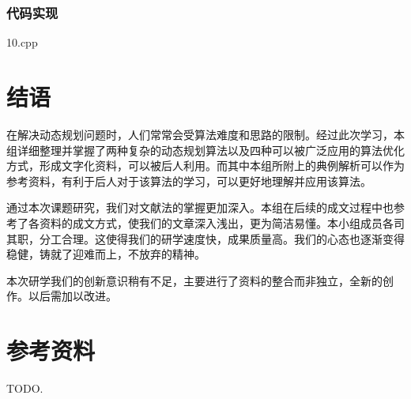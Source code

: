 \subsubsection{代码实现}

10.cpp

\section{结语}

在解决动态规划问题时，人们常常会受算法难度和思路的限制。经过此次学习，本组详细整理并掌握了两种复杂的动态规划算法以及四种可以被广泛应用的算法优化方式，形成文字化资料，可以被后人利用。而其中本组所附上的典例解析可以作为参考资料，有利于后人对于该算法的学习，可以更好地理解并应用该算法。

通过本次课题研究，我们对文献法的掌握更加深入。本组在后续的成文过程中也参考了各资料的成文方式，使我们的文章深入浅出，更为简洁易懂。本小组成员各司其职，分工合理。这使得我们的研学速度快，成果质量高。我们的心态也逐渐变得稳健，铸就了迎难而上，不放弃的精神。

本次研学我们的创新意识稍有不足，主要进行了资料的整合而非独立，全新的创作。以后需加以改进。

\section{参考资料}

TODO.

